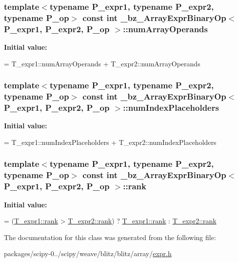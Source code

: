 \subsubsection[{num\+Array\+Operands}]{\setlength{\rightskip}{0pt plus 5cm}template$<$typename P\+\_\+expr1, typename P\+\_\+expr2, typename P\+\_\+op$>$ const int {\bf \+\_\+bz\+\_\+\+Array\+Expr\+Binary\+Op}$<$ P\+\_\+expr1, P\+\_\+expr2, P\+\_\+op $>$\+::num\+Array\+Operands\hspace{0.3cm}{\ttfamily [static]}}\label{class__bz__ArrayExprBinaryOp_acc12dce488dac94b1e25e7672d556cae}
{\bfseries Initial value\+:}
\begin{DoxyCode}
= T\_expr1::numArrayOperands
                         + T\_expr2::numArrayOperands
\end{DoxyCode}
\hypertarget{class__bz__ArrayExprBinaryOp_ae2270092c60ff26deb5574340a73cea1}{}
\subsubsection[{num\+Index\+Placeholders}]{\setlength{\rightskip}{0pt plus 5cm}template$<$typename P\+\_\+expr1, typename P\+\_\+expr2, typename P\+\_\+op$>$ const int {\bf \+\_\+bz\+\_\+\+Array\+Expr\+Binary\+Op}$<$ P\+\_\+expr1, P\+\_\+expr2, P\+\_\+op $>$\+::num\+Index\+Placeholders\hspace{0.3cm}{\ttfamily [static]}}\label{class__bz__ArrayExprBinaryOp_ae2270092c60ff26deb5574340a73cea1}
{\bfseries Initial value\+:}
\begin{DoxyCode}
= T\_expr1::numIndexPlaceholders
                             + T\_expr2::numIndexPlaceholders
\end{DoxyCode}
\hypertarget{class__bz__ArrayExprBinaryOp_a21b807f5de687f033836d8a82bae7f10}{}
\subsubsection[{rank}]{\setlength{\rightskip}{0pt plus 5cm}template$<$typename P\+\_\+expr1, typename P\+\_\+expr2, typename P\+\_\+op$>$ const int {\bf \+\_\+bz\+\_\+\+Array\+Expr\+Binary\+Op}$<$ P\+\_\+expr1, P\+\_\+expr2, P\+\_\+op $>$\+::rank\hspace{0.3cm}{\ttfamily [static]}}\label{class__bz__ArrayExprBinaryOp_a21b807f5de687f033836d8a82bae7f10}
{\bfseries Initial value\+:}
\begin{DoxyCode}
= (\hyperlink{zfftnd_8c_a6cfd95afd0afebd625b889fb6e58371c}{T\_expr1::rank} > \hyperlink{zfftnd_8c_a6cfd95afd0afebd625b889fb6e58371c}{T\_expr2::rank}) 
             ? \hyperlink{zfftnd_8c_a6cfd95afd0afebd625b889fb6e58371c}{T\_expr1::rank} : \hyperlink{zfftnd_8c_a6cfd95afd0afebd625b889fb6e58371c}{T\_expr2::rank}
\end{DoxyCode}


The documentation for this class was generated from the following file\+:\begin{DoxyCompactItemize}
\item 
packages/scipy-\/0../scipy/weave/blitz/blitz/array/\hyperlink{expr_8h}{expr.\+h}\end{DoxyCompactItemize}
